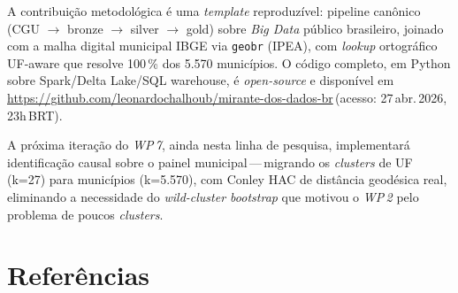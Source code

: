 \documentclass[12pt,a4paper,oneside]{article}
\newcommand{\xurl}[2]{\url{#1}\,(acesso: #2)}
\begin{document}
A contribuição metodológica é uma \textit{template} reproduzível: pipeline
canônico (CGU $\rightarrow$ bronze $\rightarrow$ silver $\rightarrow$ gold)
sobre \textit{Big Data} público brasileiro, joinado com a malha digital
municipal IBGE via \texttt{geobr} (IPEA), com \textit{lookup} ortográfico
UF-aware que resolve 100\,\% dos 5.570 municípios. O código completo, em
Python sobre Spark/Delta Lake/SQL warehouse, é \textit{open-source} e
disponível em
\xurl{https://github.com/leonardochalhoub/mirante-dos-dados-br}{27\,abr.\,2026, 23h\,BRT}.

A próxima iteração do \textit{WP\,7}, ainda nesta linha de pesquisa,
implementará identificação causal sobre o painel municipal\,---\,migrando
os \textit{clusters} de UF (k=27) para municípios (k=5.570), com Conley HAC
de distância geodésica real, eliminando a necessidade do \textit{wild-cluster
bootstrap} que motivou o \textit{WP\,2} pelo problema de poucos
\textit{clusters}.

\section*{Referências}\label{sec:ref}
\end{document}
